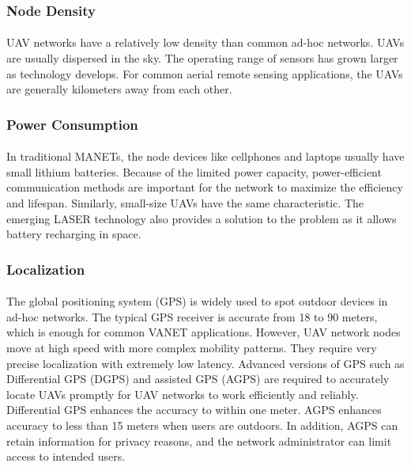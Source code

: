 \documentclass[a4paper,12pt]{report}
\begin{document}
\subsubsection{Node Density}
\paragraph{}
UAV networks have a relatively low density than common ad-hoc networks. UAVs are usually dispersed in the sky. The operating range of sensors has grown larger as technology develops. For common aerial remote sensing applications, the UAVs are generally kilometers away from each other.

\subsubsection{Power Consumption}
\paragraph{}
In traditional MANETs, the node devices like cellphones and laptops usually have small lithium batteries. Because of the limited power capacity, power-efficient communication methods are important for the network to maximize the efficiency and lifespan\cite{lashari}. Similarly, small-size UAVs have the same characteristic. The emerging LASER technology also provides a solution to the problem as it allows battery recharging in space\cite{zhao2020efficiency}. 

\subsubsection{Localization}
\paragraph{}
The global positioning system (GPS) is widely used to spot outdoor devices in ad-hoc networks. The typical GPS receiver is accurate from 18 to 90 meters\cite{993780}, which is enough for common VANET applications. However, UAV network nodes move at high speed with more complex mobility patterns. They require very precise localization with extremely low latency\cite{lashari}. Advanced versions of GPS such as Differential GPS (DGPS) and assisted GPS (AGPS) are required to accurately locate UAVs promptly for UAV networks to work efficiently and reliably. Differential GPS enhances the accuracy to within one meter. AGPS enhances accuracy to less than 15 meters when users are outdoors. In addition, AGPS can retain information for privacy reasons, and the network administrator can limit access to intended users\cite{993780}.
\end{document}

